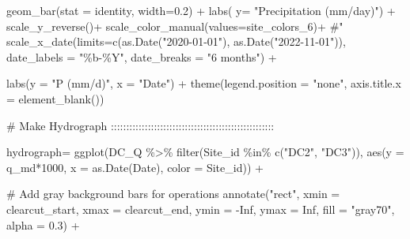 \documentclass[
  letterpaper,
  DIV=11,
  numbers=noendperiod]{scrartcl}
\newenvironment{Shaded}{\begin{snugshade}}{\end{snugshade}}
\newcommand{\AttributeTok}[1]{\textcolor[rgb]{0.40,0.45,0.13}{#1}}
\newcommand{\CommentTok}[1]{\textcolor[rgb]{0.37,0.37,0.37}{#1}}
\newcommand{\ConstantTok}[1]{\textcolor[rgb]{0.56,0.35,0.01}{#1}}
\newcommand{\DecValTok}[1]{\textcolor[rgb]{0.68,0.00,0.00}{#1}}
\newcommand{\FloatTok}[1]{\textcolor[rgb]{0.68,0.00,0.00}{#1}}
\newcommand{\FunctionTok}[1]{\textcolor[rgb]{0.28,0.35,0.67}{#1}}
\newcommand{\NormalTok}[1]{\textcolor[rgb]{0.00,0.23,0.31}{#1}}
\newcommand{\OtherTok}[1]{\textcolor[rgb]{0.00,0.23,0.31}{#1}}
\newcommand{\SpecialCharTok}[1]{\textcolor[rgb]{0.37,0.37,0.37}{#1}}
\newcommand{\StringTok}[1]{\textcolor[rgb]{0.13,0.47,0.30}{#1}}
\begin{document}
\begin{Shaded}
\begin{Highlighting}[]
  \FunctionTok{geom\_bar}\NormalTok{(}\AttributeTok{stat =} \StringTok{\textquotesingle{}identity\textquotesingle{}}\NormalTok{, }\AttributeTok{width=}\FloatTok{0.2}\NormalTok{) }\SpecialCharTok{+}
  \FunctionTok{labs}\NormalTok{( }\AttributeTok{y=} \StringTok{"Precipitation (mm/day)"}\NormalTok{) }\SpecialCharTok{+}
  \FunctionTok{scale\_y\_reverse}\NormalTok{()}\SpecialCharTok{+}
  \FunctionTok{scale\_color\_manual}\NormalTok{(}\AttributeTok{values=}\NormalTok{site\_colors\_6)}\SpecialCharTok{+} \CommentTok{\#"}
  \FunctionTok{scale\_x\_date}\NormalTok{(}\AttributeTok{limits=}\FunctionTok{c}\NormalTok{(}\FunctionTok{as.Date}\NormalTok{(}\StringTok{"2020{-}01{-}01"}\NormalTok{), }\FunctionTok{as.Date}\NormalTok{(}\StringTok{"2022{-}11{-}01"}\NormalTok{)),}
               \AttributeTok{date\_labels =} \StringTok{"\%b{-}\%Y"}\NormalTok{, }\AttributeTok{date\_breaks =} \StringTok{"6 months"}\NormalTok{) }\SpecialCharTok{+}
  
  
  \FunctionTok{labs}\NormalTok{(}\AttributeTok{y =} \StringTok{"P (mm/d)"}\NormalTok{,  }\AttributeTok{x =} \StringTok{"Date"}\NormalTok{) }\SpecialCharTok{+}
  \FunctionTok{theme}\NormalTok{(}\AttributeTok{legend.position =} \StringTok{"none"}\NormalTok{, }\AttributeTok{axis.title.x =} \FunctionTok{element\_blank}\NormalTok{())}



\CommentTok{\# Make Hydrograph :::::::::::::::::::::::::::::::::::::::::::::::::::::}

\NormalTok{hydrograph}\OtherTok{=} \FunctionTok{ggplot}\NormalTok{(DC\_Q }\SpecialCharTok{\%\textgreater{}\%}
         \FunctionTok{filter}\NormalTok{(Site\_id }\SpecialCharTok{\%in\%} \FunctionTok{c}\NormalTok{(}\StringTok{"DC2"}\NormalTok{, }\StringTok{"DC3"}\NormalTok{)),}
       \FunctionTok{aes}\NormalTok{(}\AttributeTok{y =}\NormalTok{ q\_md}\SpecialCharTok{*}\DecValTok{1000}\NormalTok{, }\AttributeTok{x =} \FunctionTok{as.Date}\NormalTok{(Date), }\AttributeTok{color =}\NormalTok{ Site\_id)) }\SpecialCharTok{+}
  
  \CommentTok{\# Add gray background bars for operations}
  \FunctionTok{annotate}\NormalTok{(}\StringTok{"rect"}\NormalTok{, }
           \AttributeTok{xmin =}\NormalTok{ clearcut\_start, }\AttributeTok{xmax =}\NormalTok{ clearcut\_end,}
           \AttributeTok{ymin =} \SpecialCharTok{{-}}\ConstantTok{Inf}\NormalTok{, }\AttributeTok{ymax =} \ConstantTok{Inf}\NormalTok{,}
           \AttributeTok{fill =} \StringTok{"gray70"}\NormalTok{, }\AttributeTok{alpha =} \FloatTok{0.3}\NormalTok{) }\SpecialCharTok{+}
  

\end{Highlighting}
\end{Shaded}
\end{document}
